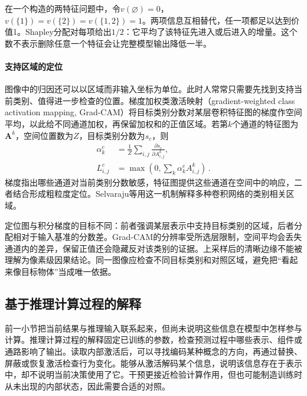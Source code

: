 \begin{example}[共同信息的贡献分配]
\label{ex:interpretability-redundancy}
在一个构造的两特征问题中，令$v(\varnothing)=0$，$v(\{1\})=v(\{2\})=v(\{1,2\})=1$。两项信息互相替代，任一项都足以达到价值1。Shapley分配对每项给出$1/2$：它平均了该特征先进入或后进入的增量。这个数不表示删除任意一个特征会让完整模型输出降低一半。
\end{example}

\paragraph{支持区域的定位}

图像中的归因还可以以区域而非输入坐标为单位。此时人常常只需要先找到支持当前类别、值得进一步检查的位置。梯度加权类激活映射（gradient-weighted class activation mapping, Grad-CAM）将目标类别分数对某层卷积特征图的梯度作空间平均，以此给不同通道加权，再保留加权和的正值区域。若第$k$个通道的特征图为$\bm A^k$，空间位置数为$Z$，目标类别分数为$s_c$，则
\begin{equation}
 \begin{aligned}
 \alpha_k^c&=\frac{1}{Z}\sum_{i,j}
 \frac{\partial s_c}{\partial A^k_{i,j}},\\
 L^c_{i,j}&=\max\!\left(0,\sum_k\alpha_k^c A^k_{i,j}\right)\, .
 \end{aligned}
 \label{eq:interpretability-gradcam}
\end{equation}
梯度指出哪些通道对当前类别分数敏感，特征图提供这些通道在空间中的响应，二者结合形成粗粒度定位。Selvaraju等用这一机制解释多种卷积网络的类别相关区域。

定位图与积分梯度的目标不同：前者强调某层表示中支持目标类别的区域，后者分配相对于输入基准的分数差。Grad-CAM的分辨率受所选层限制，空间平均会丢失通道内的差异，保留正值还会隐藏反对该类别的证据。上采样后的清晰边缘不能被理解为像素级因果结论。同一图像应检查不同目标类别和对照区域，避免把“看起来像目标物体”当成唯一依据。

\subsection{基于推理计算过程的解释}
\label{sec:interpretability-local-mechanism}

前一小节把当前结果与推理输入联系起来，但尚未说明这些信息在模型中怎样参与计算。推理计算过程的解释固定已训练的参数，检查预测过程中哪些表示、组件或通路影响了输出。读取内部激活后，可以寻找编码某种概念的方向，再通过替换、屏蔽或恢复激活检查行为变化。能够从激活解码某个信息，说明该信息存在于表示中，却不说明当前决策使用了它。干预更接近检验计算作用，但也可能制造训练时从未出现的内部状态，因此需要合适的对照。

